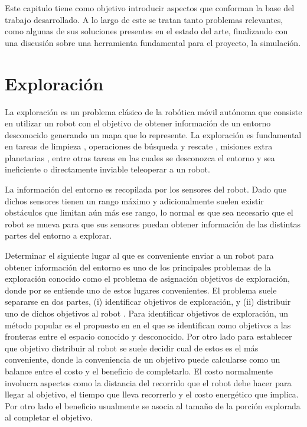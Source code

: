 Este capitulo tiene como objetivo introducir aspectos que conforman la base del
trabajo desarrollado. A lo largo de este se tratan tanto problemas relevantes,
como algunas de sus soluciones presentes en el estado del arte, finalizando con
una discusión sobre una herramienta fundamental para el proyecto, la
simulación.

\section{Exploración}\label{sec:exploracion}
La exploración es un problema clásico de la robótica
móvil autónoma que consiste en utilizar un robot con el objetivo de obtener
información de un entorno desconocido generando un mapa que lo represente. La
exploración es fundamental en tareas de limpieza \cite{luo2002real}, operaciones
de búsqueda y rescate \cite{Liu2015}, misiones extra planetarias
\cite{schuster2019towards}, entre otras tareas en las cuales se desconozca
el entorno y sea ineficiente o directamente inviable teleoperar a un robot.

La información del entorno es recopilada por los sensores del robot. Dado que
dichos sensores tienen un rango máximo y adicionalmente suelen existir obstáculos que
limitan aún más ese rango, lo normal es que sea necesario que el robot se mueva
para que sus sensores puedan obtener información de las distintas partes del
entorno a explorar. 

Determinar el siguiente lugar al que es conveniente enviar a un robot para
obtener información del entorno es uno de los principales problemas de la
exploración conocido como el problema de asignación objetivos de exploración,
donde por  se entiende uno de estos lugares
convenientes. El problema suele separarse en dos partes, (i) identificar
objetivos de exploración, y (ii) distribuir uno de dichos objetivos al robot
\cite{wurm2008coordinated}. Para identificar objetivos de exploración, un
método popular es el propuesto en \cite{yamauchi1998frontier} en el que se
identifican como objetivos a las fronteras entre el espacio conocido y
desconocido. Por otro lado para establecer que objetivo distribuir al robot se
suele decidir cual de estos es el más conveniente, donde la conveniencia de un
objetivo puede calcularse como un balance entre el costo y el beneficio de
completarlo. El costo normalmente involucra aspectos como la distancia del
recorrido que el robot debe hacer para llegar al objetivo, el tiempo que lleva recorrerlo y el costo energético que implica. Por
otro lado el beneficio usualmente se asocia al tamaño de la porción explorada
al completar el objetivo. 


